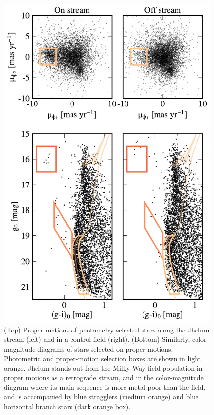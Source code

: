 \documentclass[twocolumn]{aastex62}
\newcommand{\apw}[1]{{\color{blue} APW: #1}}
\begin{document}
\begin{figure}
\begin{center}
\includegraphics[width=0.99\columnwidth]{selection.pdf}
\end{center}
\caption{
(Top) Proper motions of photometry-selected stars along the Jhelum stream (left) and in a control field (right).
(Bottom) Similarly, color-magnitude diagrams of stars selected on proper motions.
Photometric and proper-motion selection boxes are shown in light orange.
Jhelum stands out from the Milky Way field population in proper motions as a retrograde stream, and in the color-magnitude diagram where its main sequence is more metal-poor than the field, and is accompanied by blue stragglers (medium orange) and blue horizontal branch stars (dark orange box).
}
\label{fig:properties}
\end{figure}
\end{document}
